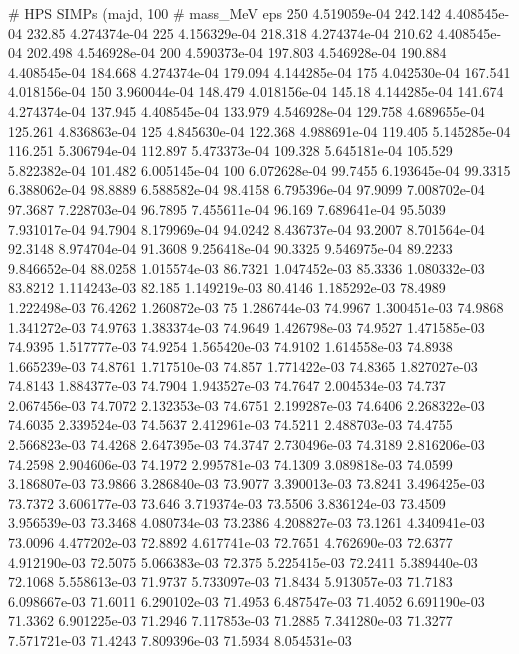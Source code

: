 # HPS SIMPs (majd, 100%
# mass_MeV  eps
250  4.519059e-04
242.142  4.408545e-04
232.85  4.274374e-04
225  4.156329e-04
218.318  4.274374e-04
210.62  4.408545e-04
202.498  4.546928e-04
200  4.590373e-04
197.803  4.546928e-04
190.884  4.408545e-04
184.668  4.274374e-04
179.094  4.144285e-04
175  4.042530e-04
167.541  4.018156e-04
150  3.960044e-04
148.479  4.018156e-04
145.18  4.144285e-04
141.674  4.274374e-04
137.945  4.408545e-04
133.979  4.546928e-04
129.758  4.689655e-04
125.261  4.836863e-04
125  4.845630e-04
122.368  4.988691e-04
119.405  5.145285e-04
116.251  5.306794e-04
112.897  5.473373e-04
109.328  5.645181e-04
105.529  5.822382e-04
101.482  6.005145e-04
100  6.072628e-04
99.7455  6.193645e-04
99.3315  6.388062e-04
98.8889  6.588582e-04
98.4158  6.795396e-04
97.9099  7.008702e-04
97.3687  7.228703e-04
96.7895  7.455611e-04
96.169  7.689641e-04
95.5039  7.931017e-04
94.7904  8.179969e-04
94.0242  8.436737e-04
93.2007  8.701564e-04
92.3148  8.974704e-04
91.3608  9.256418e-04
90.3325  9.546975e-04
89.2233  9.846652e-04
88.0258  1.015574e-03
86.7321  1.047452e-03
85.3336  1.080332e-03
83.8212  1.114243e-03
82.185  1.149219e-03
80.4146  1.185292e-03
78.4989  1.222498e-03
76.4262  1.260872e-03
75  1.286744e-03
74.9967  1.300451e-03
74.9868  1.341272e-03
74.9763  1.383374e-03
74.9649  1.426798e-03
74.9527  1.471585e-03
74.9395  1.517777e-03
74.9254  1.565420e-03
74.9102  1.614558e-03
74.8938  1.665239e-03
74.8761  1.717510e-03
74.857  1.771422e-03
74.8365  1.827027e-03
74.8143  1.884377e-03
74.7904  1.943527e-03
74.7647  2.004534e-03
74.737  2.067456e-03
74.7072  2.132353e-03
74.6751  2.199287e-03
74.6406  2.268322e-03
74.6035  2.339524e-03
74.5637  2.412961e-03
74.5211  2.488703e-03
74.4755  2.566823e-03
74.4268  2.647395e-03
74.3747  2.730496e-03
74.3189  2.816206e-03
74.2598  2.904606e-03
74.1972  2.995781e-03
74.1309  3.089818e-03
74.0599  3.186807e-03
73.9866  3.286840e-03
73.9077  3.390013e-03
73.8241  3.496425e-03
73.7372  3.606177e-03
73.646  3.719374e-03
73.5506  3.836124e-03
73.4509  3.956539e-03
73.3468  4.080734e-03
73.2386  4.208827e-03
73.1261  4.340941e-03
73.0096  4.477202e-03
72.8892  4.617741e-03
72.7651  4.762690e-03
72.6377  4.912190e-03
72.5075  5.066383e-03
72.375  5.225415e-03
72.2411  5.389440e-03
72.1068  5.558613e-03
71.9737  5.733097e-03
71.8434  5.913057e-03
71.7183  6.098667e-03
71.6011  6.290102e-03
71.4953  6.487547e-03
71.4052  6.691190e-03
71.3362  6.901225e-03
71.2946  7.117853e-03
71.2885  7.341280e-03
71.3277  7.571721e-03
71.4243  7.809396e-03
71.5934  8.054531e-03

